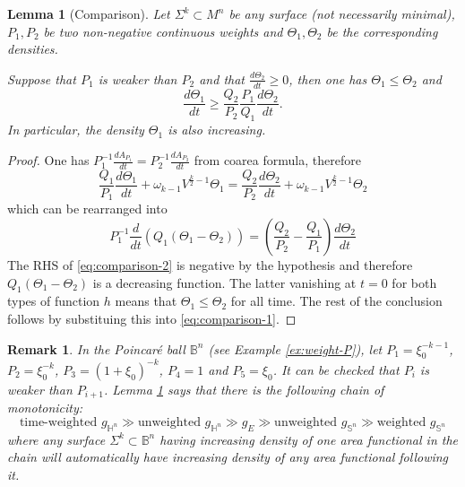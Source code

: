 \documentclass[11pt]{article}
\newtheorem{remark}[theorem]{Remark}
\newtheorem{lemma}[theorem]{Lemma}
\begin{document}
\begin{lemma}[Comparison]
\label{lem:comparison}
Let \(\Sigma^k\subset M^n\) be any surface (not necessarily minimal), \(P_1, P_2\) be
two non-negative continuous
weights and \(\Theta_1,\Theta_2\) be the corresponding densities.

Suppose that \(P_1\) is weaker than \(P_2\) and that \(\frac{d\Theta_2}{dt}\geq 0\), then one has \(\Theta_1\leq\Theta_2\) and 
\[ 
   \frac{d\Theta_1}{dt} \geq \frac{Q_2}{P_2}\frac{P_1}{Q_1}
   \frac{d\Theta_2}{dt}.
\]
In particular, the density \(\Theta_1\) is also increasing.
\end{lemma}
\begin{proof}
One has \(P_1^{-1} \frac{dA_{P_1}}{dt} = P_2^{-1}\frac{dA_{P_2}}{dt}\) from coarea
formula, therefore
\begin{equation}
\label{eq:comparison-1}
\frac{Q_1}{P_1}\frac{d\Theta_1}{dt} + \omega_{k-1}V^{\frac{k}{2}-1}\Theta_1 = \frac{Q_2}{P_2}\frac{d\Theta_2}{dt} + \omega_{k-1}V^{\frac{k}{2}-1}\Theta_2
\end{equation}
which can be rearranged into
\begin{equation}
\label{eq:comparison-2}
P_1^{-1} \frac{d}{dt}\left( Q_1(\Theta_1 -\Theta_2) \right) = \left(\frac{Q_2}{P_2}-\frac{Q_1}{P_1}\right) \frac{d\Theta_2}{dt}
\end{equation}
The RHS of \eqref{eq:comparison-2} is negative by the hypothesis and therefore \(Q_1(\Theta_1 -
\Theta_2)\) is a decreasing function. 
The latter vanishing at \(t=0\) for both types of function \(h\) means that \(\Theta_1\leq\Theta_2\)
for all time. The rest of the conclusion follows by substituing this into \eqref{eq:comparison-1}.
\end{proof}


\begin{remark}
\label{rem:comparison}
In the Poincaré ball \(\mathbb{B}^n\) (see Example \ref{ex:weight-P}), let 
   \(P_1 = \xi_0^{-k-1}\), \(P_2 =\xi_0^{-k}\), \(P_3 = (1+\xi_0)^{-k}\), \(P_4=1\) and \(P_5=\xi_0\). It can be checked that \(P_i\) is weaker than \(P_{i+1}\). Lemma
   \ref{lem:comparison} says that there is the following chain of monotonicity:
\begin{equation}
\label{eq:chain}
\text{time-weighted }  g_{\mathbb{H}^n} \gg   \text{unweighted } g_{\mathbb{H}^n}
\gg g_E  \gg \text{unweighted } g_{\mathbb{S}^n}   \gg \text{weighted } g_{\mathbb{S}^n} 
\end{equation}
where any surface \(\Sigma^k\subset \mathbb{B}^n\) having increasing density of one area
functional in the chain will automatically have increasing density of any area functional
following it.
\end{remark}
\end{document}
